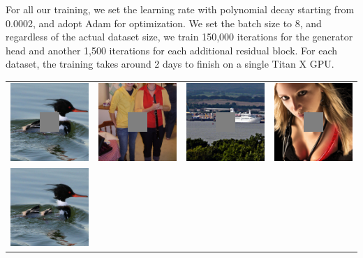 For all our training, we set the learning rate with polynomial decay starting from 0.0002, and adopt Adam for optimization. We set the batch size to 8, and regardless of the actual dataset size, we train 150,000 iterations for the generator head and another 1,500 iterations for each additional residual block. For each dataset, the training takes around 2 days to finish on a single Titan X GPU.

\begin{longtable}{cccc}
  \includegraphics[width=.24\textwidth]{figures/imagenet/imagenet_0011_input_image.png}&
  \includegraphics[width=.24\textwidth]{figures/imagenet/imagenet_0034_input_image.png}&
  \includegraphics[width=.24\textwidth]{figures/imagenet/imagenet_0165_input_image.png}&
  \includegraphics[width=.24\textwidth]{figures/imagenet/imagenet_0197_input_image.png}\\
  \includegraphics[width=.24\textwidth]{figures/imagenet/imagenet_0011_pm.jpg}&

\end{longtable}
